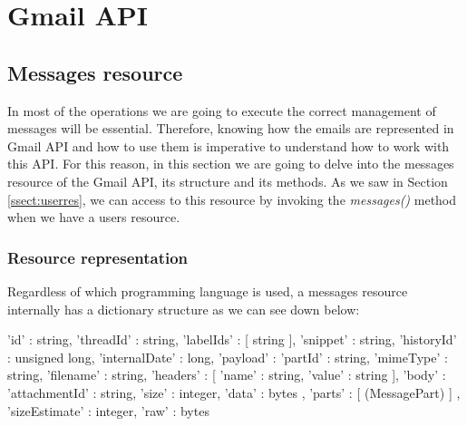 \section{Gmail API}\label{sect:gmailapi}

\subsection{Messages resource}\label{ssect:msgres}
In most of the operations we are going to execute the correct management of messages will be essential. Therefore, knowing how the emails are represented in Gmail API and how to use them is imperative to understand how to work with this API. For this reason, in this section we are going to delve into the messages resource of the Gmail API, its structure and its methods. As we saw in Section \ref{ssect:userres}, we can access to this resource by invoking the \textit{messages()} method when we have a users resource.

\subsubsection{Resource representation}\label{sssect:msgresrep}

Regardless of which programming language is used, a messages resource \citep[/v1/reference/users/messages]{gmailAPI} internally has a dictionary structure as we can see down below:

\begin{python}
{
'id' : string,
'threadId' : string,
'labelIds' : [ string ],
'snippet' : string,
'historyId' : unsigned long,
'internalDate' : long,
'payload' : {
	'partId' : string,
	'mimeType' : string,
	'filename' : string,
	'headers' : [
		{
		'name' : string,
		'value' : string
		}
	],
	'body' : {
		'attachmentId' : string,
		'size' : integer,
		'data' : bytes
	},
	'parts' : [ (MessagePart) ]
	},
'sizeEstimate' : integer,
'raw' : bytes
}
\end{python}

